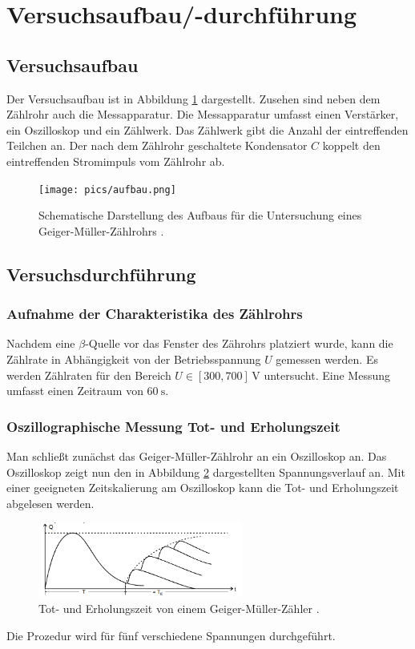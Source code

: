 \section{Versuchsaufbau/-durchführung}

\subsection{Versuchsaufbau}
Der Versuchsaufbau ist in Abbildung \ref{fig: versuchsaufabu} dargestellt.
Zusehen sind neben dem Zählrohr auch die Messapparatur.   %
Die Messapparatur umfasst einen Verstärker, ein Oszilloskop und
ein Zählwerk. Das Zählwerk gibt die Anzahl der eintreffenden Teilchen
an. Der nach dem Zählrohr geschaltete Kondensator $C$ koppelt den eintreffenden
Stromimpuls vom Zählrohr ab.
\begin{figure}
  \centering
  \texttt{[image: pics/aufbau.png]}
  \caption{Schematische Darstellung des Aufbaus für die Untersuchung eines Geiger-Müller-Zählrohrs \cite{anleitung703}.}
  \label{fig: versuchsaufabu}
  \end{figure}
\subsection{Versuchsdurchführung}

\subsubsection{Aufnahme der Charakteristika des Zählrohrs} %

Nachdem eine $\beta$-Quelle vor das Fenster des Zährohrs platziert wurde,
kann die Zählrate in Abhängigkeit von der Betriebsspannung $U$ gemessen werden.
Es werden Zählraten für den Bereich $U\in\left[300, 700\right] \, \si{\volt}$
untersucht. Eine Messung umfasst einen Zeitraum von $\SI{60}{\second}$.


\subsubsection{Oszillographische Messung Tot- und Erholungszeit} %
Man schließt zunächst das Geiger-Müller-Zählrohr an ein
Oszilloskop an. Das Oszilloskop zeigt nun den in Abbildung \ref{fig: totzeit}
dargestellten Spannungsverlauf an. Mit einer geeigneten Zeitskalierung am Oszilloskop
kann die Tot- und Erholungszeit abgelesen werden.
\begin{figure}
  \centering
  \includegraphics[width=0.6\textwidth]{bilder/totzeit.png}
  \caption{Tot- und Erholungszeit von einem Geiger-Müller-Zähler \cite{anleitung703}.}
  \label{fig: totzeit}
  \end{figure}
Die Prozedur wird für fünf verschiedene Spannungen durchgeführt.

